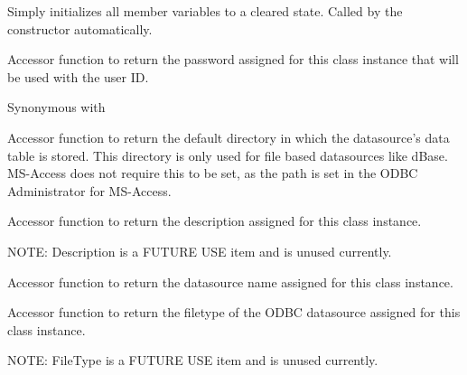 \label{wxdbconnectinfinitialize}

Simply initializes all member variables to a cleared state.  Called by 
the constructor automatically.


\label{wxdbconnectinfgetauthstr}


Accessor function to return the password assigned for this class 
instance that will be used with the user ID.

Synonymous with 


\label{wxdbconnectinfgetdefaultdir}


Accessor function to return the default directory in which the datasource's data 
table is stored.  This directory is only used for file based datasources like 
dBase.  MS-Access does not require this to be set, as the path is set in the 
ODBC Administrator for MS-Access.


\label{wxdbconnectinfgetdescription}


Accessor function to return the description assigned for this class 
instance.

NOTE: Description is a FUTURE USE item and is unused currently.


\label{wxdbconnectinfgetdsn}


Accessor function to return the datasource name assigned for this class 
instance.


\label{wxdbconnectinfgetfiletype}


Accessor function to return the filetype of the ODBC datasource assigned for 
this class instance.

NOTE: FileType is a FUTURE USE item and is unused currently.


\label{wxdbconnectinfgethenv}


